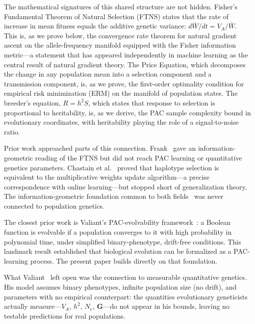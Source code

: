 \documentclass[12pt]{article}
\theoremstyle{remark}
\begin{document}
The mathematical signatures of this shared structure are not hidden. Fisher's Fundamental Theorem of Natural Selection (FTNS) states that the rate of increase in mean fitness equals the additive genetic variance: $d\bar{W}/dt = V_A/\bar{W}$. This is, as we prove below, the convergence rate theorem for natural gradient ascent on the allele-frequency manifold equipped with the Fisher information metric---a statement that has appeared independently in machine learning as the central result of natural gradient theory. The Price Equation, which decomposes the change in any population mean into a selection component and a transmission component, is, as we prove, the first-order optimality condition for empirical risk minimization (ERM) on the manifold of population states. The breeder's equation, $R = h^2 S$, which states that response to selection is proportional to heritability, is, as we derive, the PAC sample complexity bound in evolutionary coordinates, with heritability playing the role of a signal-to-noise ratio.

Prior work approached parts of this connection. Frank~\cite{frank2009,frank2012} gave an information-geometric reading of the FTNS but did not reach PAC learning or quantitative genetics parameters. Chastain et al.~\cite{chastain2014} proved that haplotype selection is equivalent to the multiplicative weights update algorithm---a precise correspondence with online learning---but stopped short of generalization theory. The information-geometric foundation common to both fields~\cite{amari2000} was never connected to population genetics.

The closest prior work is Valiant's PAC-evolvability framework~\cite{valiant2009}: a Boolean function is evolvable if a population converges to it with high probability in polynomial time, under simplified binary-phenotype, drift-free conditions. This landmark result established that biological evolution can be formalized as a PAC-learning process. The present paper builds directly on that foundation.

What Valiant~\cite{valiant2009} left open was the connection to measurable quantitative genetics. His model assumes binary phenotypes, infinite population size (no drift), and parameters with no empirical counterpart: the quantities evolutionary geneticists actually measure---$V_A$, $h^2$, $N_e$, $\mathbf{G}$---do not appear in his bounds, leaving no testable predictions for real populations.
\end{document}
